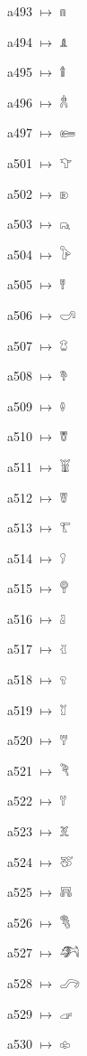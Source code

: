 {\noindent a493 $\mapsto$ {\ahfont 𔘤}\par
\noindent a494 $\mapsto$ {\ahfont 𔘥}\par
\noindent a495 $\mapsto$ {\ahfont 𔘦}\par
\noindent a496 $\mapsto$ {\ahfont 𔘧}\par
\noindent a497 $\mapsto$ {\ahfont 𔘨}\par
\noindent a501 $\mapsto$ {\ahfont 𔘩}\par
\noindent a502 $\mapsto$ {\ahfont 𔘪}\par
\noindent a503 $\mapsto$ {\ahfont 𔘫}\par
\noindent a504 $\mapsto$ {\ahfont 𔘬}\par
\noindent a505 $\mapsto$ {\ahfont 𔘭}\par
\noindent a506 $\mapsto$ {\ahfont 𔘮}\par
\noindent a507 $\mapsto$ {\ahfont 𔘯}\par
\noindent a508 $\mapsto$ {\ahfont 𔘰}\par
\noindent a509 $\mapsto$ {\ahfont 𔘱}\par
\noindent a510 $\mapsto$ {\ahfont 𔘲}\par
\noindent a511 $\mapsto$ {\ahfont 𔘳}\par
\noindent a512 $\mapsto$ {\ahfont 𔘴}\par
\noindent a513 $\mapsto$ {\ahfont 𔘵}\par
\noindent a514 $\mapsto$ {\ahfont 𔘶}\par
\noindent a515 $\mapsto$ {\ahfont 𔘷}\par
\noindent a516 $\mapsto$ {\ahfont 𔘸}\par
\noindent a517 $\mapsto$ {\ahfont 𔘹}\par
\noindent a518 $\mapsto$ {\ahfont 𔘺}\par
\noindent a519 $\mapsto$ {\ahfont 𔘻}\par
\noindent a520 $\mapsto$ {\ahfont 𔘼}\par
\noindent a521 $\mapsto$ {\ahfont 𔘽}\par
\noindent a522 $\mapsto$ {\ahfont 𔘾}\par
\noindent a523 $\mapsto$ {\ahfont 𔘿}\par
\noindent a524 $\mapsto$ {\ahfont 𔙀}\par
\noindent a525 $\mapsto$ {\ahfont 𔙁}\par
\noindent a526 $\mapsto$ {\ahfont 𔙂}\par
\noindent a527 $\mapsto$ {\ahfont 𔙃}\par
\noindent a528 $\mapsto$ {\ahfont 𔙄}\par
\noindent a529 $\mapsto$ {\ahfont 𔙅}\par
\noindent a530 $\mapsto$ {\ahfont 𔙆}\par
}